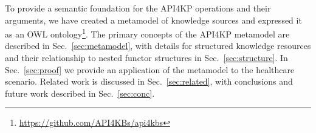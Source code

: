 \documentclass[runningheads]{llncs}
\begin{document}
To provide a semantic foundation for the API4KP operations and their arguments, we have created a metamodel of knowledge sources and expressed it as an OWL ontology\footnote{\url{https://github.com/API4KBs/api4kbs}}.
The primary concepts  of the API4KP metamodel are described in Sec.~\ref{sec:metamodel}, with details for structured knowledge resources and their relationship to nested functor structures in Sec.~\ref{sec:structure}.
In Sec.~\ref{sec:proof} we provide an application of the metamodel to the healthcare scenario.
Related work is discussed in Sec.~\ref{sec:related}, with conclusions and future work described in Sec.~\ref{sec:conc}.


\end{document}
